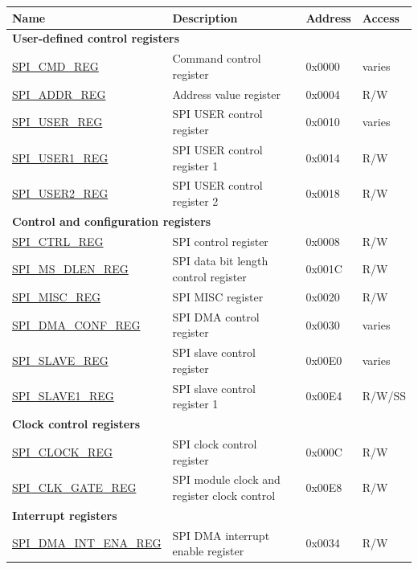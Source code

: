 \begin{longtable}{ | p{5.5cm} | p{7.2cm} | p{1.3cm} | p{1.5cm} | }
\hline\rowcolor{lightgray}
\textbf{Name} & \textbf{Description} &  \textbf{Address} & \textbf{Access} \\ \hline
\endhead
\multicolumn{4}{|l|}{\textbf{User-defined control registers}} \\ \hline
\hyperref[regdesc:SPICMDREG]{SPI\_CMD\_REG} & Command control register & 0x0000 & varies \\ \hline
\hyperref[regdesc:SPIADDRREG]{SPI\_ADDR\_REG} & Address value register & 0x0004 & R/W \\ \hline
\hyperref[regdesc:SPIUSERREG]{SPI\_USER\_REG} & SPI USER control register & 0x0010 & varies \\ \hline
\hyperref[regdesc:SPIUSER1REG]{SPI\_USER1\_REG} & SPI USER control register 1 & 0x0014 & R/W \\ \hline
\hyperref[regdesc:SPIUSER2REG]{SPI\_USER2\_REG} & SPI USER control register 2 & 0x0018 & R/W \\ \hline
\multicolumn{4}{|l|}{\textbf{Control and configuration registers}} \\ \hline
\hyperref[regdesc:SPICTRLREG]{SPI\_CTRL\_REG} & SPI control register & 0x0008 & R/W \\ \hline
\hyperref[regdesc:SPIMSDLENREG]{SPI\_MS\_DLEN\_REG} & SPI data bit length control register & 0x001C & R/W \\ \hline
\hyperref[regdesc:SPIMISCREG]{SPI\_MISC\_REG} & SPI MISC register & 0x0020 & R/W \\ \hline
\hyperref[regdesc:SPIDMACONFREG]{SPI\_DMA\_CONF\_REG} & SPI DMA control register & 0x0030 & varies \\ \hline
\hyperref[regdesc:SPISLAVEREG]{SPI\_SLAVE\_REG} & SPI slave control register & 0x00E0 & varies \\ \hline
\hyperref[regdesc:SPISLAVE1REG]{SPI\_SLAVE1\_REG} & SPI slave control register 1 & 0x00E4 & R/W/SS \\ \hline
\multicolumn{4}{|l|}{\textbf{Clock control registers}} \\ \hline
\hyperref[regdesc:SPICLOCKREG]{SPI\_CLOCK\_REG} & SPI clock control register & 0x000C & R/W \\ \hline
\hyperref[regdesc:SPICLKGATEREG]{SPI\_CLK\_GATE\_REG} & SPI module clock and register clock control & 0x00E8 & R/W \\ \hline
\multicolumn{4}{|l|}{\textbf{Interrupt registers}} \\ \hline
\hyperref[regdesc:SPIDMAINTENAREG]{SPI\_DMA\_INT\_ENA\_REG} & SPI DMA interrupt enable register & 0x0034 & R/W \\ \hline

\end{longtable}
